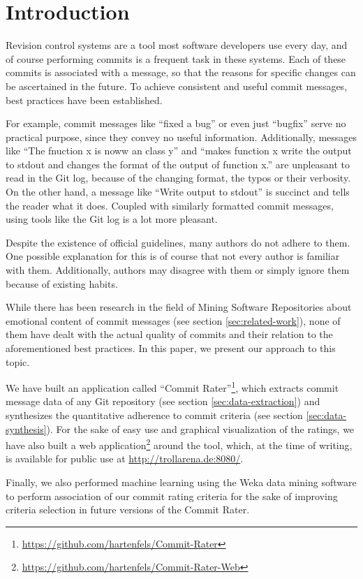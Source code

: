 \section{Introduction}
\label{sec:introduction}

%
%
%
%
%
%

Revision control systems are a tool most software developers use every day, and of course performing commits is a frequent task in these systems. Each of these commits is associated with a message, so that the reasons for specific changes can be ascertained in the future\cite{CB}. To achieve consistent and useful commit messages, best practices have been established\cite{OffGuide,CB,TP,SR}.

For example, commit messages like ``fixed a bug'' or even just ``bugfix'' serve no practical purpose, since they convey no useful information. Additionally, messages like ``The fnuction x is noww an class y'' and ``makes function x write the output to stdout and changes the format of the output of function x.'' are unpleasant to read in the Git log, because of the changing format, the typos or their verbosity. On the other hand, a message like ``Write output to stdout'' is succinct and tells the reader what it does. Coupled with similarly formatted commit messages, using tools like the Git log is a lot more pleasant.

Despite the existence of official guidelines, many authors do not adhere to them. One possible explanation for this is of course that not every author is familiar with them. Additionally, authors may disagree with them or simply ignore them because of existing habits.

While there has been research in the field of Mining Software Repositories about emotional content of commit messages (see section \ref{sec:related-work}), none of them have dealt with the actual quality of commits and their relation to the aforementioned best practices. In this paper, we present our approach to this topic.

We have built an application called ``Commit Rater''\footnote{\url{https://github.com/hartenfels/Commit-Rater}}, which extracts commit message data of any Git repository (see section \ref{sec:data-extraction}) and synthesizes the quantitative adherence to commit criteria (see section \ref{sec:data-synthesis}). For the sake of easy use and graphical visualization of the ratings, we have also built a web application\footnote{\url{https://github.com/hartenfels/Commit-Rater-Web}} around the tool, which, at the time of writing, is available for public use at \url{http://trollarena.de:8080/}.

Finally, we also performed machine learning using the Weka data mining software\cite{Weka} to perform association of our commit rating criteria for the sake of improving criteria selection in future versions of the Commit Rater.
